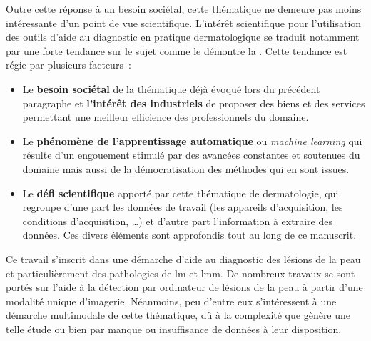 Outre cette réponse à un besoin sociétal, cette thématique ne demeure pas moins intéressante d’un point de vue scientifique. L’intérêt scientifique pour l'utilisation des outils d'aide au diagnostic en pratique dermatologique se traduit notamment par une forte tendance sur le sujet comme le démontre la . Cette tendance est régie par plusieurs facteurs~:
\begin{itemize}
    \item Le \textbf{besoin sociétal} de la thématique déjà évoqué lors du précédent paragraphe et \textbf{l'intérêt des industriels} de proposer des biens et des services permettant une meilleur efficience des professionnels du domaine.
    \item Le \textbf{phénomène de l'apprentissage automatique} ou \textit{machine learning} qui résulte d'un engouement stimulé par des avancées constantes et soutenues du domaine mais aussi de la démocratisation des méthodes qui en sont issues. 
    \item Le \textbf{défi scientifique} apporté par cette thématique de dermatologie, qui regroupe d'une part les données de travail (les appareils d'acquisition, les conditions d'acquisition, \ldots) et d'autre part l'information à extraire des données. Ces divers éléments sont approfondis tout au long de ce manuscrit.
\end{itemize}\par
\clearpage

Ce travail s'inscrit dans une démarche d'aide au diagnostic des lésions de la peau et particulièrement des pathologies de \gls{lm} et \gls{lmm}. De nombreux travaux se sont portés sur l'aide à la détection par ordinateur de lésions de la peau à partir d'une modalité unique d'imagerie. Néanmoins, peu d'entre eux s'intéressent à une démarche multimodale de cette thématique, dû à la complexité que gènère une telle étude ou bien par manque ou insuffisance de données à leur disposition.\par

